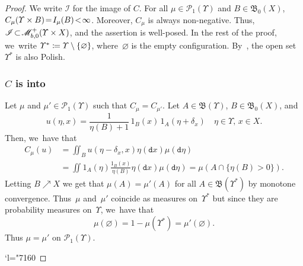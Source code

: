 \documentclass[10pt]{amsart}
\newcommand{\Changel}{\mathcode`l="7160}
\theoremstyle{definition}
\theoremstyle{remark}
\DeclarePairedDelimiter{\set}{\lbrace}{\rbrace}
\begin{document}
\begin{proof}
We write $\mathscr{I}$ for the image of $C$.
For all $\mu \in \mathscr{P}_{1}(\varUpsilon)$ and $B \in \mathfrak{B}_{0}(X)$, $C_{\mu}(\varUpsilon \times\nobreak B) \!=\! I_{\mu}(B) \!<\! \infty$.
Moreover, $C_{\mu}$ is always non-negative.
Thus, $\mathscr{I} \!\subset\! \mathscr{M}^{+}_{b,0}(\varUpsilon \times\nobreak X)$, and the assertion is well-posed.
In the rest of the proof, we~write $\varUpsilon^{*} \coloneq \varUpsilon \setminus \set{\varnothing}$, where~$\varnothing$ is the empty configuration.
By~\cite[IX, p.\,57, Prop.\,1]{BourbakiTopo2}, the open set $\varUpsilon^{*}$ is also Polish.
\subsubsection*{$C$ is into}
Let $\mu$ and $\mu' \in \mathscr{P}_{1}(\varUpsilon)$ such that $C_{\mu} = C_{\mu'}$.
Let $A \in \mathfrak{B}(\varUpsilon)$, $B \in \mathfrak{B}_{0}(X)$, and
\begin{equation*}
u(\eta, x) = \frac{1}{\eta(B) + 1}\, 1_{B}(x)\, 1_{A}(\eta + \delta_{x}) \quad \eta \in \varUpsilon,\, x \in X.
\end{equation*}
Then, we~have that
\begin{align*}
C_{\mu}(u) &= \iint_{B} u(\eta - \delta_{x}, x) \eta(\mathtt{d} x) \mu(\mathtt{d} \eta)\\
&= \iint 1_{A}(\eta) \frac{1_{B}(x)}{\eta(B)} \eta(\mathtt{d} x) \mu(\mathtt{d} \eta) = \mu(A \cap \{\eta(B) > 0 \}).
\end{align*}
Letting $B \nearrow X$ we get that $\mu(A) = \mu'(A)$ for all $A \in \mathfrak{B}(\varUpsilon^{*})$ by monotone convergence.
Thus~$\mu$ and~$\mu'$ coincide as measures on~$\varUpsilon^{*}$ but since they are probability measures on~$\varUpsilon$, we~have that
\begin{equation*}
\mu(\varnothing) = 1 -\mu(\varUpsilon^{*}) = \mu'(\varnothing).
\end{equation*}
Thus $\mu = \mu'$ on $\mathscr{P}_{1}(\varUpsilon)$.

\Changel

\end{proof}
\end{document}
